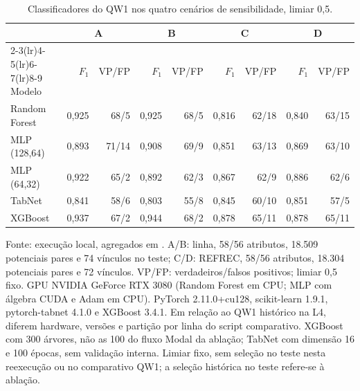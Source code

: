 \begin{table}[htbp]
\centering\footnotesize
\caption{Classificadores do QW1 nos quatro cenários de sensibilidade, limiar 0,5.}
\label{tab:sensibilidade-qw1}
\setlength{\tabcolsep}{4pt}
\begin{tabular}{lrrrrrrrr}
\toprule
 & \multicolumn{2}{c}{A} & \multicolumn{2}{c}{B} & \multicolumn{2}{c}{C} & \multicolumn{2}{c}{D} \\
\cmidrule(lr){2-3}\cmidrule(lr){4-5}\cmidrule(lr){6-7}\cmidrule(lr){8-9}
Modelo & $F_1$ & VP/FP & $F_1$ & VP/FP & $F_1$ & VP/FP & $F_1$ & VP/FP \\
\midrule
Random Forest & 0,925 & 68/5 & 0,925 & 68/5 & 0,816 & 62/18 & 0,840 & 63/15 \\
MLP (128,64) & 0,893 & 71/14 & 0,908 & 69/9 & 0,851 & 63/13 & 0,869 & 63/10 \\
MLP (64,32) & 0,922 & 65/2 & 0,892 & 62/3 & 0,867 & 62/9 & 0,886 & 62/6 \\
TabNet & 0,841 & 58/6 & 0,803 & 55/8 & 0,845 & 60/10 & 0,851 & 57/5 \\
XGBoost & 0,937 & 67/2 & 0,944 & 68/2 & 0,878 & 65/11 & 0,878 & 65/11 \\
\bottomrule
\end{tabular}
\begin{minipage}{0.98\textwidth}\footnotesize Fonte: execução local, agregados em . A/B: linha, 58/56 atributos, 18.509 potenciais pares e 74 vínculos no teste; C/D: REFREC, 58/56 atributos, 18.304 potenciais pares e 72 vínculos. VP/FP: verdadeiros/falsos positivos; limiar 0,5 fixo. GPU NVIDIA GeForce RTX 3080 (Random Forest em CPU; MLP com álgebra CUDA e Adam em CPU). PyTorch 2.11.0+cu128, scikit-learn 1.9.1, pytorch-tabnet 4.1.0 e XGBoost 3.4.1. Em relação ao QW1 histórico na L4, diferem hardware, versões e partição por linha do script comparativo. XGBoost com 300 árvores, não as 100 do fluxo Modal da ablação; TabNet com dimensão 16 e 100 épocas, sem validação interna. Limiar fixo, sem seleção no teste nesta reexecução ou no comparativo QW1; a seleção histórica no teste refere-se à ablação.
\end{minipage}
\end{table}
